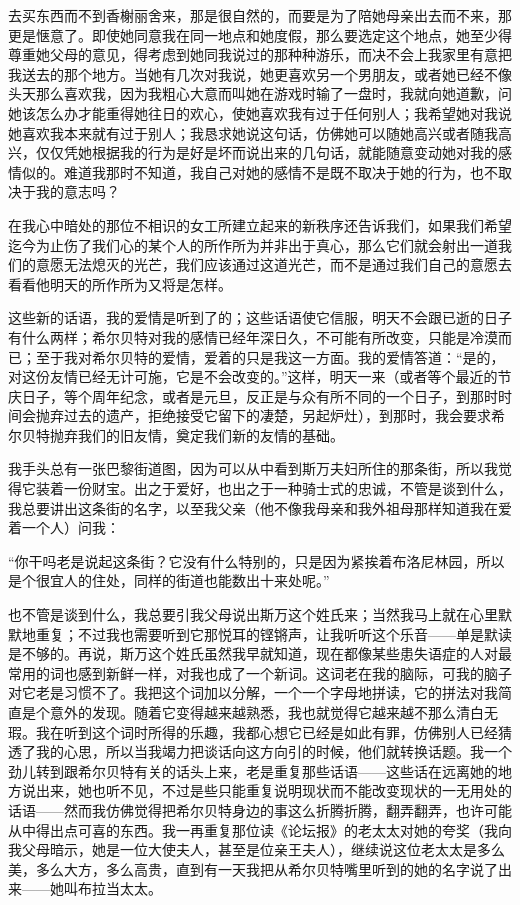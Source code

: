 去买东西而不到香榭丽舍来，那是很自然的，而要是为了陪她母亲出去而不来，那更是惬意了。即使她同意我在同一地点和她度假，那么要选定这个地点，她至少得尊重她父母的意见，得考虑到她同我说过的那种种游乐，而决不会上我家里有意把我送去的那个地方。当她有几次对我说，她更喜欢另一个男朋友，或者她已经不像头天那么喜欢我，因为我粗心大意而叫她在游戏时输了一盘时，我就向她道歉，问她该怎么办才能重得她往日的欢心，使她喜欢我有过于任何别人；我希望她对我说她喜欢我本来就有过于别人；我恳求她说这句话，仿佛她可以随她高兴或者随我高兴，仅仅凭她根据我的行为是好是坏而说出来的几句话，就能随意变动她对我的感情似的。难道我那时不知道，我自己对她的感情不是既不取决于她的行为，也不取决于我的意志吗？
\par 在我心中暗处的那位不相识的女工所建立起来的新秩序还告诉我们，如果我们希望迄今为止伤了我们心的某个人的所作所为并非出于真心，那么它们就会射出一道我们的意愿无法熄灭的光芒，我们应该通过这道光芒，而不是通过我们自己的意愿去看看他明天的所作所为又将是怎样。
\par 这些新的话语，我的爱情是听到了的；这些话语使它信服，明天不会跟已逝的日子有什么两样；希尔贝特对我的感情已经年深日久，不可能有所改变，只能是冷漠而已；至于我对希尔贝特的爱情，爱着的只是我这一方面。我的爱情答道：“是的，对这份友情已经无计可施，它是不会改变的。”这样，明天一来（或者等个最近的节庆日子，等个周年纪念，或者是元旦，反正是与众有所不同的一个日子，到那时时间会抛弃过去的遗产，拒绝接受它留下的凄楚，另起炉灶），到那时，我会要求希尔贝特抛弃我们的旧友情，奠定我们新的友情的基础。
\par 我手头总有一张巴黎街道图，因为可以从中看到斯万夫妇所住的那条街，所以我觉得它装着一份财宝。出之于爱好，也出之于一种骑士式的忠诚，不管是谈到什么，我总要讲出这条街的名字，以至我父亲（他不像我母亲和我外祖母那样知道我在爱着一个人）问我：
\par “你干吗老是说起这条街？它没有什么特别的，只是因为紧挨着布洛尼林园，所以是个很宜人的住处，同样的街道也能数出十来处呢。”
\par 也不管是谈到什么，我总要引我父母说出斯万这个姓氏来；当然我马上就在心里默默地重复；不过我也需要听到它那悦耳的铿锵声，让我听听这个乐音——单是默读是不够的。再说，斯万这个姓氏虽然我早就知道，现在都像某些患失语症的人对最常用的词也感到新鲜一样，对我也成了一个新词。这词老在我的脑际，可我的脑子对它老是习惯不了。我把这个词加以分解，一个一个字母地拼读，它的拼法对我简直是个意外的发现。随着它变得越来越熟悉，我也就觉得它越来越不那么清白无瑕。我在听到这个词时所得的乐趣，我都心想它已经是如此有罪，仿佛别人已经猜透了我的心思，所以当我竭力把谈话向这方向引的时候，他们就转换话题。我一个劲儿转到跟希尔贝特有关的话头上来，老是重复那些话语——这些话在远离她的地方说出来，她也听不见，不过是些只能重复说明现状而不能改变现状的一无用处的话语——然而我仿佛觉得把希尔贝特身边的事这么折腾折腾，翻弄翻弄，也许可能从中得出点可喜的东西。我一再重复那位读《论坛报》的老太太对她的夸奖（我向我父母暗示，她是一位大使夫人，甚至是位亲王夫人），继续说这位老太太是多么美，多么大方，多么高贵，直到有一天我把从希尔贝特嘴里听到的她的名字说了出来——她叫布拉当太太。
